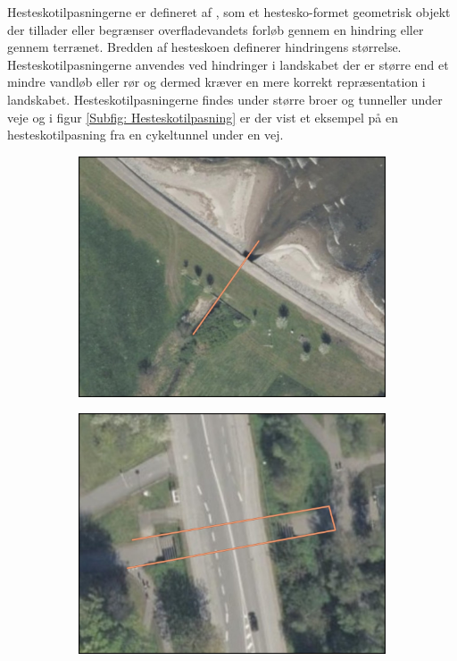 Hesteskotilpasningerne er defineret af \cite{DHM_Hestesko}, som et hestesko-formet geometrisk objekt der tillader eller begrænser overfladevandets forløb gennem en hindring eller gennem terrænet. Bredden af hesteskoen definerer hindringens størrelse. Hesteskotilpasningerne anvendes ved hindringer i landskabet der er større end et mindre vandløb eller rør og dermed kræver en mere korrekt repræsentation i landskabet. Hesteskotilpasningerne findes under større broer og tunneller under veje og i figur \ref{Subfig: Hesteskotilpasning} er der vist et eksempel på en hesteskotilpasning fra en cykeltunnel under en vej.
\begin{figure}[H]
    \begin{subfigure}[b]{0.5\textwidth}
        \centering
        \includegraphics[width=1\linewidth]{images/databeskrivelse/linje.jpg}
        \caption{}
        \label{Subfig: Linjetilpasning}
    \end{subfigure}
    \hspace{0.2cm}
    \begin{subfigure}[b]{0.5\textwidth}
        \centering
        \includegraphics[width=1\linewidth]{images/databeskrivelse/hestesko.jpg}

\end{subfigure}
\end{figure}
